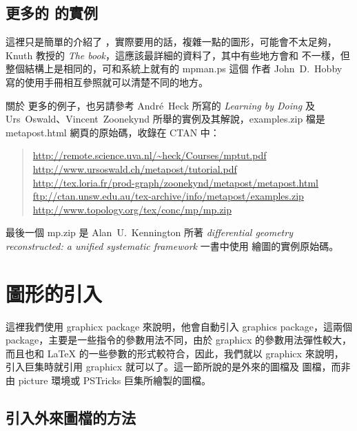 \subsection{更多的 \MP{} 的實例}

這裡只是簡單的介紹了 \MP{}，實際要用的話，複雜一點的圖形，可能會不太足夠，Knuth 教授的 \textit{The \MF{}book}，這應該最詳細的資料了，其中有些地方會和 \MP{} 不一樣，但整個結構上是相同的，可和系統上就有的 {\ttfamily mpman.ps} 這個 \MP{} 作者 John~D.~Hobby 寫的使用手冊相互參照就可以清楚不同的地方。

關於 \MP{} 更多的例子，也另請參考 Andr\'e~Heck 所寫的 \textit{Learning \MP{} by Doing} 及 Urs~Oswald、Vincent~Zoonekynd 所舉的實例及其解說，{\ttfamily examples.zip} 檔是 {\ttfamily metapost.html} 網頁的原始碼，收錄在 CTAN 中：

\begin{quote}
  \url{http://remote.science.uva.nl/~heck/Courses/mptut.pdf}            \\
  \url{http://www.ursoswald.ch/metapost/tutorial.pdf}                   \\
  \url{http://tex.loria.fr/prod-graph/zoonekynd/metapost/metapost.html} \\
  \url{ftp://ctan.unsw.edu.au/tex-archive/info/metapost/examples.zip}   \\
  \url{http://www.topology.org/tex/conc/mp/mp.zip}
\end{quote}

最後一個 {\ttfamily mp.zip} 是 Alan~U.~Kennington 所著 \textit{differential geometry reconstructed: a unified systematic framework} 一書中使用 \MP{} 繪圖的實例原始碼。

\section{圖形的引入}
\label{sec:includegr}

這裡我們使用 {\sffamily graphicx} package 來說明，他會自動引入 {\sffamily graphics} package，這兩個 package，主要是一些指令的參數用法不同，由於 {\sffamily graphicx} 的參數用法彈性較大，而且也和 \LaTeX{} 的一些參數的形式較符合，因此，我們就以 {\sffamily graphicx} 來說明，引入巨集時就引用 {\sffamily graphicx} 就可以了。這一節所說的是外來的圖檔及 \MP{} 圖檔，而非由 {\ttfamily picture} 環境或 {\sffamily PSTricks} 巨集所繪製的圖檔。

\subsection{引入外來圖檔的方法}

